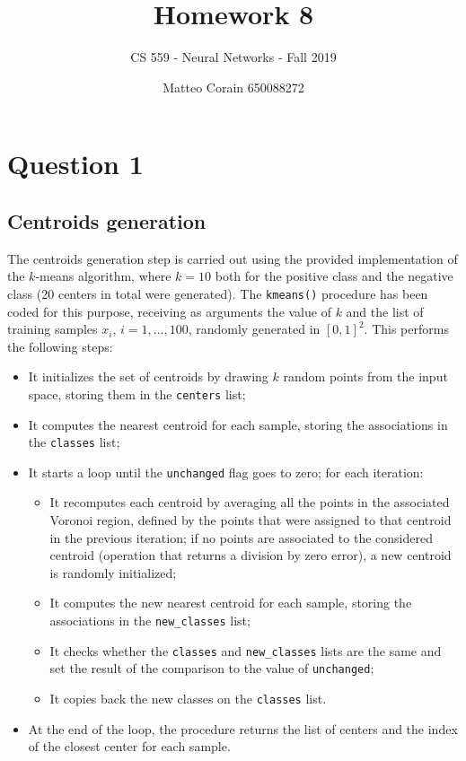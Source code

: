 \documentclass[letterpaper,headings=standardclasses]{scrartcl}
\title{Homework 8}
\subtitle{CS 559 - Neural Networks - Fall 2019}
\author{Matteo Corain 650088272}
\begin{document}
\maketitle

\section{Question 1}

\subsection{Centroids generation}

The centroids generation step is carried out using the provided implementation of the $k$-means algorithm, where $k = 10$ both for the positive class and the negative class (20 centers in total were generated). The \texttt{kmeans()} procedure has been coded for this purpose, receiving as arguments the value of $k$ and the list of training samples $x_i$, $i = 1, \dots, 100$, randomly generated in $\left[ 0,1 \right]^2$. This performs the following steps:

\begin{itemize}
    \item It initializes the set of centroids by drawing $k$ random points from the input space, storing them in the \texttt{centers} list;
    \item It computes the nearest centroid for each sample, storing the associations in the \texttt{classes} list;
    \item It starts a loop until the \texttt{unchanged} flag goes to zero; for each iteration:
    \begin{itemize}
        \item It recomputes each centroid by averaging all the points in the associated Voronoi region, defined by the points that were assigned to that centroid in the previous iteration; if no points are associated to the considered centroid (operation that returns a division by zero error), a new centroid is randomly initialized;
        \item It computes the new nearest centroid for each sample, storing the associations in the \texttt{new\_classes} list;
        \item It checks whether the \texttt{classes} and \texttt{new\_classes} lists are the same and set the result of the comparison to the value of \texttt{unchanged};
        \item It copies back the new classes on the \texttt{classes} list.
    \end{itemize}
    \item At the end of the loop, the procedure returns the list of centers and the index of the closest center for each sample.
\end{itemize}
\end{document}
